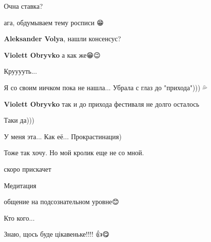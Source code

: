  
 
 
 
 

\qqSecCmt


Очна ставка?

\begin{itemize} %

ага, обдумываем тему росписи 😁

\textbf{Aleksander Volya}, нашли консенсус? 🤔

\textbf{Violett Obryvko} а как же😁😉


Крууууть...

Я со своим иичком пока не нашла... Убрала с глаз до "прихода"))) 💦

\textbf{Violett Obryvko} так и до прихода фестиваля не долго осталось🤔😁


Таки да)))

У меня эта... Как её... Прокрастинация)
\end{itemize} %


Тоже так хочу. Но мой кролик еще не со мной.

\begin{itemize} %
скоро прискачет🐇😉
\end{itemize} %


Медитация 🙂

\begin{itemize} %

общение на подсознательном уровне😊


Кто кого...
\end{itemize} %


Знаю, щось буде цікавеньке!!!! 👍😋

